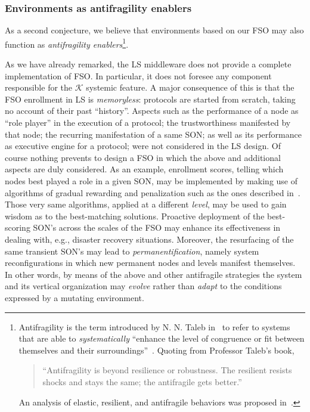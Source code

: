 \documentclass[twocolumn]{svjour3}
\def\K{\hbox{$\mathcal{K}$}}
\begin{document}
\subsubsection{Environments as antifragility enablers}
As a second conjecture, we believe that environments based on our FSO may also function
as \emph{antifragility enablers}\footnote{Antifragility is the term
	introduced by N. N. Taleb in~\cite{Taleb12} to refer to systems that are
	able to \emph{systematically\/}
	``enhance the level of congruence or fit between themselves
	and their surroundings''~\cite{stokols2013enhancing}. Quoting from Professor Taleb's book,
	\begin{quote}
	``Antifragility is beyond resilience or robustness. The resilient resists shocks
	and stays the same; the antifragile gets better.''
	\end{quote}
	An analysis of elastic, resilient, and antifragile behaviors was proposed in~\cite{DF15b}.}.

As we have already remarked, the LS middleware does not provide a complete implementation of
FSO. In particular, it does not foresee any component responsible for
the \K{} systemic feature. A major consequence of this is that the FSO enrollment in LS
is \emph{memoryless}: protocols are started from scratch, taking no account of their past ``history''.
Aspects such as the performance of a node as ``role player'' in the execution of a protocol; the
trustworthiness manifested by that node; the recurring manifestation of a same SON;
as well as its performance as executive engine for a protocol; were not considered in the LS design.
Of course nothing prevents to design a FSO in which the above and additional aspects are duly considered.
As an example, enrollment scores, telling which nodes best played a role in a given SON, may be
implemented by making use of algorithms of gradual rewarding and penalization such as the ones
described in~\cite{BDB11a,BDFB12,Buys15}. Those very same algorithms, applied at a different \emph{level},
may be used to gain wisdom as to the best-matching solutions. Proactive deployment of the best-scoring
SON's across the scales of the FSO may enhance its effectiveness in dealing with, e.g., disaster
recovery situations. Moreover, the resurfacing of the same transient SON's may lead to
\emph{permanentification}, namely system reconfigurations in which new permanent nodes and levels manifest
themselves. In other words, by means of the above and other antifragile strategies the system
and its vertical organization may \emph{evolve\/} rather than \emph{adapt\/} to the conditions expressed by a
mutating environment.
\end{document}
